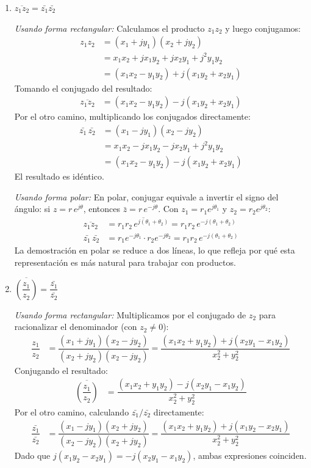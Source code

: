 \documentclass[10pt,a4paper]{article}
\begin{document}
\begin{enumerate}[label=\textbf{\alph*)}]
	\item \textbf{$\overline{z_1 z_2} = \bar{z_1}\bar{z_2}$}

	\textit{Usando forma rectangular:} Calculamos el producto $z_1 z_2$ y luego conjugamos:
	\begin{align*}
		z_1 z_2 &= (x_1+jy_1)(x_2+jy_2) \\
		&= x_1x_2 + jx_1y_2 + jx_2y_1 + j^2y_1y_2 \\
		&= (x_1x_2 - y_1y_2) + j(x_1y_2 + x_2y_1)
	\end{align*}
	Tomando el conjugado del resultado:
	\begin{align*}
		\overline{z_1 z_2} &= (x_1x_2 - y_1y_2) - j(x_1y_2 + x_2y_1)
	\end{align*}
	Por el otro camino, multiplicando los conjugados directamente:
	\begin{align*}
		\bar{z_1}\,\bar{z_2} &= (x_1-jy_1)(x_2-jy_2) \\
		&= x_1x_2 - jx_1y_2 - jx_2y_1 + j^2y_1y_2 \\
		&= (x_1x_2 - y_1y_2) - j(x_1y_2 + x_2y_1)
	\end{align*}
	El resultado es idéntico.

	\textit{Usando forma polar:} En polar, conjugar equivale a invertir el signo del ángulo: si $z = r\,e^{j\theta}$, entonces $\bar{z} = r\,e^{-j\theta}$. Con $z_1 = r_1 e^{j\theta_1}$ y $z_2 = r_2 e^{j\theta_2}$:
	\begin{align*}
		\overline{z_1 z_2} &= \overline{r_1 r_2\, e^{j(\theta_1+\theta_2)}} = r_1 r_2\, e^{-j(\theta_1+\theta_2)} \\[4pt]
		\bar{z_1}\,\bar{z_2} &= r_1 e^{-j\theta_1} \cdot r_2 e^{-j\theta_2} = r_1 r_2\, e^{-j(\theta_1+\theta_2)}
	\end{align*}
	La demostración en polar se reduce a dos líneas, lo que refleja por qué esta representación es más natural para trabajar con productos.

	\item \textbf{$\overline{\left(\dfrac{z_1}{z_2}\right)} = \dfrac{\bar{z_1}}{\bar{z_2}}$}

	\textit{Usando forma rectangular:} Multiplicamos por el conjugado de $z_2$ para racionalizar el denominador (con $z_2 \neq 0$):
	\begin{align*}
		\dfrac{z_1}{z_2} &= \dfrac{(x_1+jy_1)(x_2-jy_2)}{(x_2+jy_2)(x_2-jy_2)} = \dfrac{(x_1x_2+y_1y_2) + j(x_2y_1-x_1y_2)}{x_2^2+y_2^2}
	\end{align*}
	Conjugando el resultado:
	\begin{align*}
		\overline{\left(\dfrac{z_1}{z_2}\right)} &= \dfrac{(x_1x_2+y_1y_2) - j(x_2y_1-x_1y_2)}{x_2^2+y_2^2}
	\end{align*}
	Por el otro camino, calculando $\bar{z_1}/\bar{z_2}$ directamente:
	\begin{align*}
		\dfrac{\bar{z_1}}{\bar{z_2}} &= \dfrac{(x_1-jy_1)(x_2+jy_2)}{(x_2-jy_2)(x_2+jy_2)} = \dfrac{(x_1x_2+y_1y_2) + j(x_1y_2-x_2y_1)}{x_2^2+y_2^2}
	\end{align*}
	Dado que $j(x_1y_2-x_2y_1) = -j(x_2y_1-x_1y_2)$, ambas expresiones coinciden.


\end{enumerate}
\end{document}
